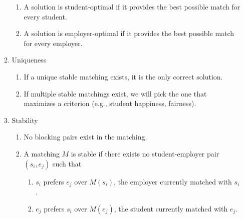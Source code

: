 \documentclass[12pt]{article}
\begin{document}
\begin{enumerate}
\begin{enumerate}
\begin{enumerate}
                    \item A solution is student-optimal if it provides the best possible match for every student.
                    \item A solution is employer-optimal if it provides the best possible match for every employer.
                \end{enumerate}
            \item Uniqueness
                \begin{enumerate}
                    \item If a unique stable matching exists, it is the only correct solution.
                    \item If multiple stable matchings exist, we will pick the one that maximizes a criterion (e.g., student happiness, fairness).
                \end{enumerate}
            \item Stability
                \begin{enumerate}
                    \item No blocking pairs exist in the matching.
                    \item A matching $M$ is stable if there exists no student-employer pair 
                    $(s_i, e_j)$ such that
                    \begin{enumerate}
                        \item $s_i$ prefers $e_j$ over $M(s_i)$, the employer currently matched with $s_i$.
                        \item $e_j$ prefers $s_i$ over $M(e_j)$, the student currently matched with $e_j$.
                    \end{enumerate}
                \end{enumerate}
        \end{enumerate}
   \end{enumerate}
\end{document}
